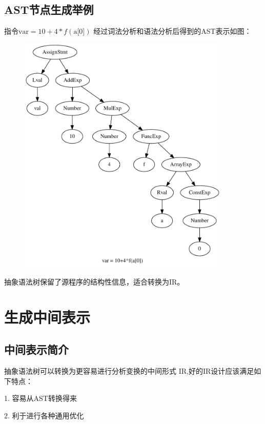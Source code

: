 \subsection{AST节点生成举例}

指令$\text{var} = 10+4*f(\text{a[0]})$ 经过词法分析和语法分析后得到的AST表示如图：

\begin{figure}[htb]
  \centering
  \includegraphics[width=0.9\textwidth]{figures/ASTnode.pdf}
  \label{fig:astnode}
\end{figure}



抽象语法树保留了源程序的结构性信息，适合转换为IR。

\section{生成中间表示}
\subsection{中间表示简介}
抽象语法树可以转换为更容易进行分析变换的中间形式 IR,好的IR设计应该满足如下特点：

1. 容易从AST转换得来

2. 利于进行各种通用优化


